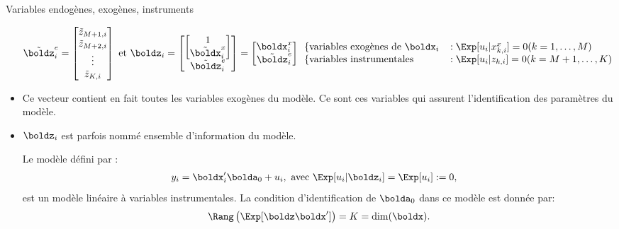 \begin{frame}[allowframebreaks]{Variables endogènes, exogènes, instruments}
\begin{itemize}
    \[
       \tilde{\boldz}_i^e = 
       \begin{bmatrix} 
        \tilde{z}_{M+1, i}\\
        \tilde{z}_{M+2, i}\\
        \vdots\\
        \tilde{z}_{K, i}
       \end{bmatrix}
       \ \text{et} \
       \boldz_i = 
       \begin{bmatrix}
        \begin{bmatrix}
            1\\
            \tilde{\boldx}_i^x
        \end{bmatrix}\\ 
        \tilde{\boldz}_i^e
       \end{bmatrix}
       = 
       \begin{bmatrix}
        \boldx_i^x\\
        \tilde{\boldz}_i^e
       \end{bmatrix}
       \begin{array}{ll}
        \left\{ \text{variables exogènes de $\boldx_i$}\right.
         &: \Exp[u_i|x_{k, i}^x] = 0 (k=1,\ldots, M)\\
        \left\{ \text{variables instrumentales}\right.&:\Exp[u_i|z_{k, i}] = 0(k=M +1,\ldots,K)
       \end{array}
    \]
    \item Ce vecteur contient en fait toutes les variables exogènes du modèle. Ce sont 
    ces variables qui assurent l’identification des paramètres du modèle.
    \item $\boldz_i$  est parfois nommé ensemble d’information du modèle.


\framebreak 

\begin{definition_fr}
    Le modèle défini par :
    \begin{align*}
        y_i&=\boldx_i^\prime\bolda_0 + u_i, \ \text{avec} \ \Exp[u_i|\boldz_i]= \Exp[u_i]:=0,
    \end{align*}
    est un modèle linéaire à variables instrumentales.
    La condition d’identification de $\bolda_0$ dans ce modèle est donnée par:
    \begin{align*}
    \Rang\left(\Exp[\boldz\boldx^\prime]\right)= K = \dim(\boldx).
\end{align*}
\end{definition_fr}


\end{itemize}
\end{frame}
